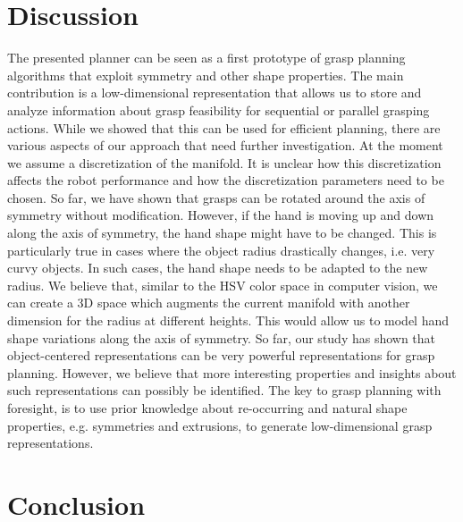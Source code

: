 \documentclass[a4paper,10pt,twocolumn]{article}
\begin{document}



\section{Discussion} 
The presented planner can be seen as a first prototype of grasp planning
algorithms that exploit symmetry and other shape properties. The main contribution
is a low-dimensional representation that allows us to store and 
analyze information about grasp feasibility for sequential or parallel 
grasping actions. While we showed that this can be used for efficient planning, there
are various aspects of our approach that need further investigation. At the moment 
we assume a discretization of the manifold. It is unclear how this discretization affects
the robot performance and how the discretization parameters need to be chosen. 
So far, we have shown that grasps can be rotated around the axis of symmetry
without modification. However, if the hand is moving up and down along the axis
of symmetry, the hand shape might have to be changed. This is particularly true in
cases where the object radius drastically changes, i.e. very curvy objects. In such 
cases, the hand shape needs to be adapted to the new radius. We believe that, similar
to the HSV color space in computer vision, we can create a 3D space which augments
the current manifold with another dimension for the radius at different heights.
This would allow us to model hand shape variations along the axis of symmetry.
So far, our study has shown that object-centered representations can be very powerful
representations for grasp planning. However, we believe that more interesting 
properties and insights about such representations can possibly be identified.
The key to grasp planning with foresight, is to use prior knowledge about 
re-occurring and natural shape properties, e.g. symmetries and extrusions, 
to generate low-dimensional grasp representations. 

\section{Conclusion}
\end{document}
